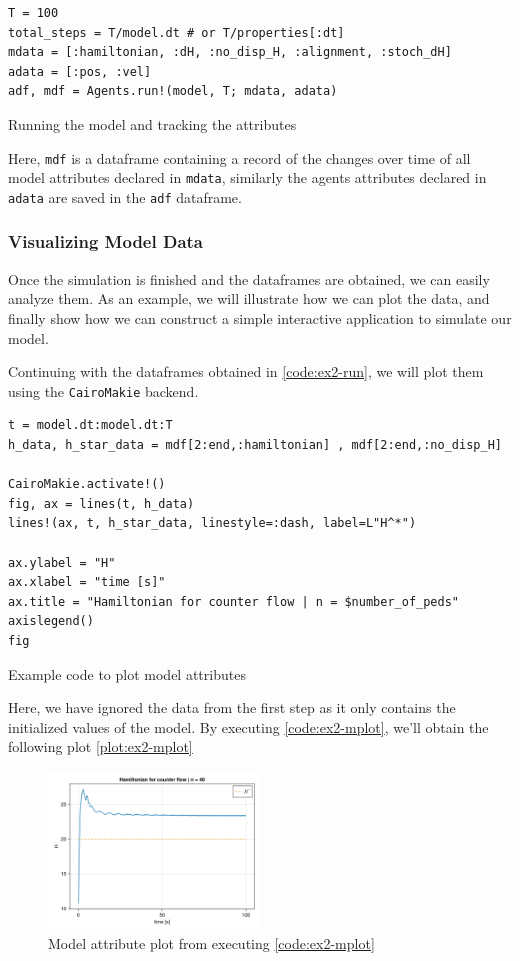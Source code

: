 \begin{listing}[H]
\begin{verbatim}
T = 100
total_steps = T/model.dt # or T/properties[:dt]
mdata = [:hamiltonian, :dH, :no_disp_H, :alignment, :stoch_dH]
adata = [:pos, :vel]
adf, mdf = Agents.run!(model, T; mdata, adata)
\end{verbatim}
\caption{Running the model and tracking the attributes}
\label{code:ex2-run}
\end{listing}

Here, \texttt{mdf} is a dataframe containing a record of the changes over time of all model attributes declared in \texttt{mdata}, similarly the agents attributes declared in \texttt{adata} are saved in the \texttt{adf} dataframe.

\subsubsection*{Visualizing Model Data}
Once the simulation is finished and the dataframes are obtained, we can easily analyze them. As an example, we will illustrate how we can plot the data, and finally show how we can construct a simple interactive application to simulate our model.

Continuing with the dataframes obtained in \autoref{code:ex2-run}, we will plot them using the \texttt{CairoMakie} backend.
\begin{listing}[H]
\begin{verbatim}
t = model.dt:model.dt:T
h_data, h_star_data = mdf[2:end,:hamiltonian] , mdf[2:end,:no_disp_H]

CairoMakie.activate!()
fig, ax = lines(t, h_data)
lines!(ax, t, h_star_data, linestyle=:dash, label=L"H^*")

ax.ylabel = "H"
ax.xlabel = "time [s]"
ax.title = "Hamiltonian for counter flow | n = $number_of_peds"
axislegend()
fig
\end{verbatim}
\caption{Example code to plot model attributes}
\label{code:ex2-mplot}
\end{listing}

Here, we have ignored the data from the first step as it only contains the initialized values of the model. By executing \autoref{code:ex2-mplot}, we'll obtain the following plot \autoref{plot:ex2-mplot}

\begin{figure}[H]
    \centering
    \includegraphics[width=0.5\textwidth]{figures/ch6_tutorial/example_plot.png}
    \caption{Model attribute plot from executing \autoref{code:ex2-mplot}}
    \label{plot:ex2-mplot}
\end{figure}

